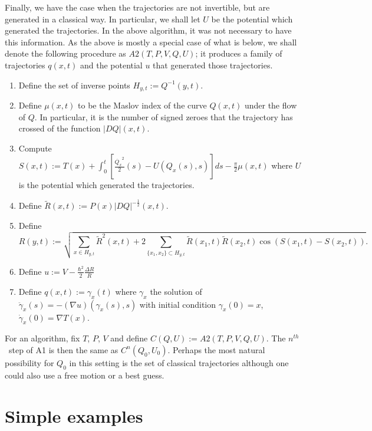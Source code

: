 \documentclass[11pt]{article}
\theoremstyle{remark}
\begin{document}
Finally, we have the case when the trajectories are not invertible, but are
generated in a classical way. In particular, we shall let $U$ be the
potential which generated the trajectories. In the above algorithm,
it was not necessary to have this information.
As the above is mostly a special case of what is below, 
we shall denote the following procedure  as $A2(T, P, V, Q,U)$; it
produces a family of trajectories $q(x, t)$ and the potential $u$ that
generated those trajectories.
\begin{enumerate}
\item Define the set of inverse points $H_{y,t} \ensuremath{:=} Q^{-1} (y,t)$. 
\item Define $\mu(x,t)$ to be the Maslov index of the curve $Q (x,t)$
under the flow of $Q$. In particular, it is the number of signed zeroes that
the trajectory has crossed of the function $\ensuremath{\lvert {DQ} \rvert} (x, t)$.
\item Compute $S (x,t) \ensuremath{:=} T(x) + \int_0^t [\frac{\dot{Q_x}^2}{2}(s) 
- U(Q_x(s),s)] ds - \frac{\pi}{2} \mu(x,t)$  where $U$ is the
  potential which generated the  trajectories. 
\item Define $\tilde{R} (x,t) \ensuremath{:=} P(x) \ensuremath{\lvert {DQ} \rvert}^{-\frac{1}{2}} (x,t)$.
\item Define 
\[  
R(y,t) \ensuremath{:=} 
\sqrt{\sum_{x \in H_{y,t}} \tilde{R}^2 (x,t) + 2 \sum_{\{x_1,
  x_2\}\subset H_{y,t}} \!\tilde{R}(x_1, t)\tilde{R}(x_2,t) 
\cos(S(x_1,t)
  -S(x_2,t))}.
\]


\item Define $u \ensuremath{:=} V  -  \frac{\ensuremath{\hbar}^2}{2}\frac{\ensuremath{\Delta} R}{R}$ 
\item Define $q(x,t) \ensuremath{:=} \gamma_x(t)$ where $\gamma_x$ the solution of
$\ddot{\gamma}_x (s) = -(\nabla u )(\gamma_x(s), s)$ with initial condition 
$\gamma_x(0) = x$, $\dot{\gamma}_x(0) = \nabla T (x)$.  
\end{enumerate}
For an algorithm, fix $T$, $P$, $V$ and define $C(Q,U) \ensuremath{:=}
A2(T,P,V,Q,U)$.
The \ensuremath{{n}^{th}}\ step of A1 is then the same as $C^n(Q_0,U_0)$. Perhaps the
most natural possibility for $Q_0$ in this setting is 
the set of classical trajectories although one could also use a free
motion or a best guess.  


\section{Simple examples}
\end{document}
